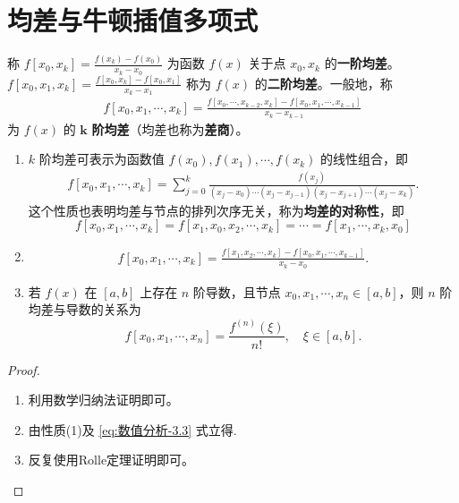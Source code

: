\documentclass[../../main.tex]{subfiles}
\begin{document}
\section{均差与牛顿插值多项式}

\begin{definition}[均差]
称 $f[x_0, x_k] = \frac{f(x_k) - f(x_0)}{x_k - x_0}$ 为函数 $f(x)$ 关于点 $x_0, x_k$ 的\textbf{一阶均差}。$f[x_0, x_1, x_k] = \frac{f[x_0, x_k] - f[x_0, x_1]}{x_k - x_1}$ 称为 $f(x)$ 的\textbf{二阶均差}。一般地，称 
\begin{align}
f[x_0, x_1, \cdots, x_k] = \frac{f[x_0, \cdots, x_{k - 2}, x_k] - f[x_0, x_1, \cdots, x_{k - 1}]}{x_k - x_{k - 1}} \label{eq:数值分析-3.3}
\end{align}
为 $f(x)$ 的 $\boldsymbol{k}$ \textbf{阶均差}（均差也称为\textbf{差商}）。
\end{definition}

\begin{theorem}[均差的基本性质]\label{theorem:均差的基本性质}
\begin{enumerate}[(1)]
\item $k$ 阶均差可表示为函数值 $f(x_0), f(x_1), \cdots, f(x_k)$ 的线性组合，即 
\begin{align}
f[x_0, x_1, \cdots, x_k] = \sum_{j = 0}^k \frac{f(x_j)}{(x_j - x_0) \cdots (x_j - x_{j - 1})(x_j - x_{j + 1}) \cdots (x_j - x_k)}. \label{eq:数值分析-3.4}
\end{align}
这个性质也表明均差与节点的排列次序无关，称为\textbf{均差的对称性}，即 
\[
f[x_0, x_1, \cdots, x_k] = f[x_1, x_0, x_2, \cdots, x_k] = \cdots = f[x_1, \cdots, x_k, x_0]
\]

\item \begin{align}
f[x_0, x_1, \cdots, x_k] = \frac{f[x_1, x_2, \cdots, x_k] - f[x_0, x_1, \cdots, x_{k - 1}]}{x_k - x_0}. \label{eq:数值分析-3.3'}
\end{align}

\item 若 $f(x)$ 在 $[a, b]$ 上存在 $n$ 阶导数，且节点 $x_0, x_1, \cdots, x_n \in [a, b]$，则 $n$ 阶均差与导数的关系为 
\[
f[x_0, x_1, \cdots, x_n] = \frac{f^{(n)}(\xi)}{n!}, \quad \xi \in [a, b].
\]
\end{enumerate}
\end{theorem}
\begin{proof}
\begin{enumerate}[(1)]
\item 利用数学归纳法证明即可。

\item 由性质(1)及 \eqref{eq:数值分析-3.3} 式立得.

\item 反复使用Rolle定理证明即可。
\end{enumerate}
\end{proof}
\end{document}
